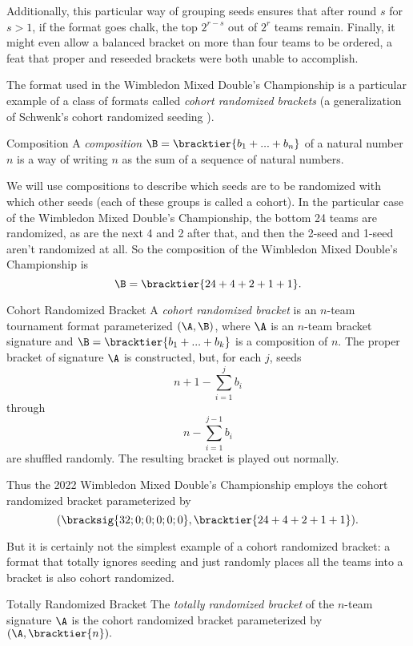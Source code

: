 {    Additionally, this particular way of grouping seeds ensures that after round $s$ for $s>1$, if the format goes chalk, the top $2^{r-s}$ out of $2^r$ teams remain. Finally, it might even allow a balanced bracket on more than four teams to be ordered, a feat that proper and reseeded brackets were both unable to accomplish.

    The format used in the Wimbledon Mixed Double's Championship is a particular example of a class of formats called \textit{cohort randomized brackets} (a generalization of Schwenk's cohort randomized seeding \cite{randomized_cohort}).

    \begin{definition}{Composition}{}
        A \textit{composition} $\B = \bracktier{b_1 + ... + b_n}$ of a natural number $n$ is a way of writing $n$ as the sum of a sequence of natural numbers.
    \end{definition}

    We will use compositions to describe which seeds are to be randomized with which other seeds (each of these groups is called a cohort). In the particular case of the Wimbledon Mixed Double's Championship, the bottom 24 teams are randomized, as are the next 4 and 2 after that, and then the 2-seed and 1-seed aren't randomized at all. So the composition of the Wimbledon Mixed Double's Championship is $$\B = \bracktier{24 + 4 + 2 + 1 + 1}.$$

    \begin{definition}{Cohort Randomized Bracket}{}
        A \textit{cohort randomized bracket} is an $n$-team tournament format parameterized $(\A, \B)$, where $\A$ is an $n$-team bracket signature and $\B = \bracktier{b_1 + ... + b_k}$ is a composition of $n$. The proper bracket of signature $\A$ is constructed, but, for each $j$, seeds $$n + 1 - \sum_{i=1}^j b_i$$ through $$n - \sum_{i=1}^{j-1} b_i$$ are shuffled randomly. The resulting bracket is played out normally.
    \end{definition}

    Thus the 2022 Wimbledon Mixed Double's Championship employs the cohort randomized bracket parameterized by $$(\bracksig{32;0;0;0;0;0}, \bracktier{24 + 4 + 2 + 1 + 1}).$$ 

    But it is certainly not the simplest example of a cohort randomized bracket: a format that totally ignores seeding and just randomly places all the teams into a bracket is also cohort randomized. 
    
    \begin{definition}{Totally Randomized Bracket}{}
        The \textit{totally randomized bracket} of the $n$-team signature $\A$ is the cohort randomized bracket parameterized by $(\A, \bracktier{n}).$
    \end{definition}

}
